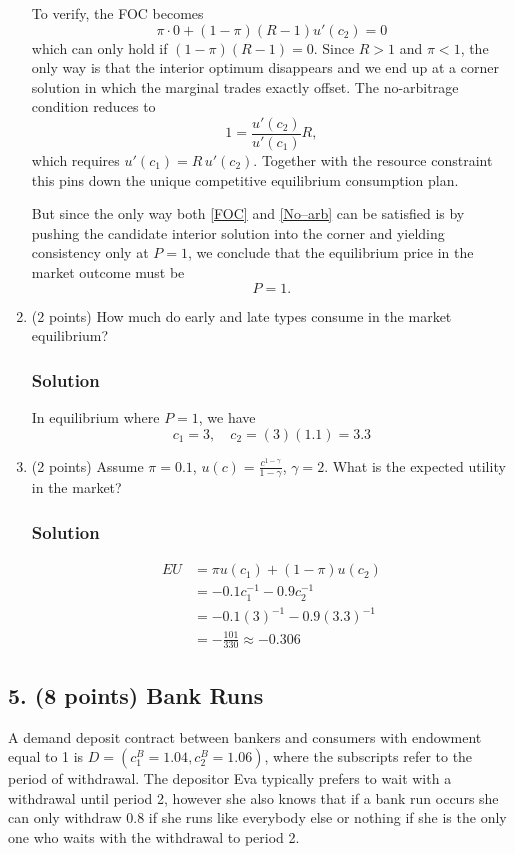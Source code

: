 \documentclass[12pt]{article}
\begin{document}
\begin{enumerate}[label=(\alph*)]
To verify, the FOC becomes $$\pi\cdot0 + (1-\pi)(R-1)u'(c_2)=0$$ which can only hold if $(1-\pi)(R-1)=0$.  Since $R>1$ and $\pi<1$, the only way is that the interior optimum disappears and we end up at a corner solution in which the marginal trades exactly offset.
The no-arbitrage condition reduces to $$1 = \dfrac{u'(c_2)}{u'(c_1)}R,$$ which requires $u'(c_1)=R\,u'(c_2)$.  Together with the resource constraint this pins down the unique competitive equilibrium consumption plan.

But since the only way both \eqref{FOC} and \eqref{No–arb} can be satisfied is by pushing the candidate interior solution into the corner and yielding consistency only at $P=1$, we conclude that the equilibrium price in the market outcome must be
$$
\boxed{P=1.}
$$    
    
    \item (2 points) How much do early and late types consume in the market equilibrium?
    \subsubsection*{Solution}

    In equilibrium where $P=1$, we have
    \[ c_1 =3, \quad c_2 = (3)(1.1) = 3.3\]

    
    \item (2 points) Assume $\pi = 0.1$, $u(c) = \frac{c^{1-\gamma}}{1- \gamma}$, $\gamma = 2$. What is the expected utility in the market?
    \subsubsection*{Solution}

    \begin{align*}
        EU &= \pi u(c_1) + (1-\pi)u(c_2) 
        \\ &= -0.1 c_1^{-1} - 0.9 c_2^{-1}
        \\ &= -0.1 (3)^{-1} - 0.9 (3.3)^{-1}
        \\ &= -\frac{101}{330} \approx -0.306
    \end{align*}


    
\end{enumerate}

\subsection*{5. (8 points) Bank Runs}

A demand deposit contract between bankers and consumers with endowment equal to 1 is $D = (c^B_1 = 1.04, c^B_2 = 1.06)$, where the subscripts refer to the period of withdrawal. The depositor Eva typically prefers to wait with a withdrawal until period 2, however she also knows that if a bank run occurs she can only withdraw 0.8 if she runs like everybody else or nothing if she is the only one who waits with the withdrawal to period 2.
\end{document}

